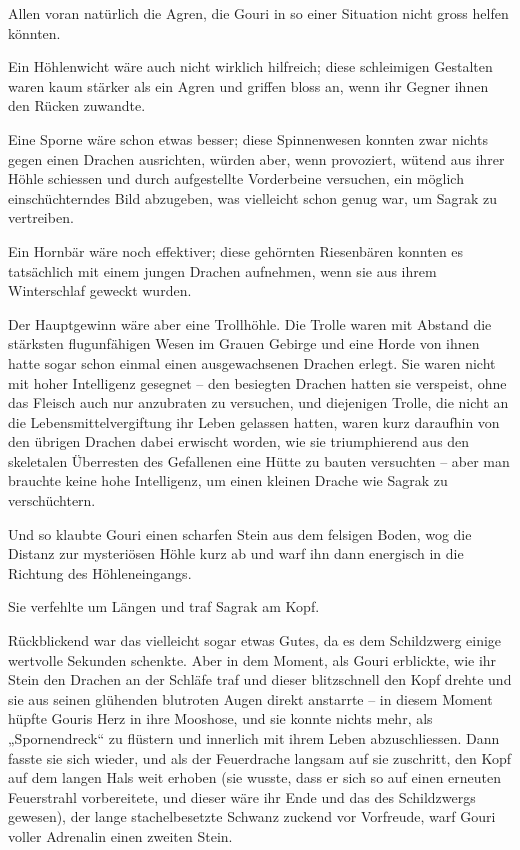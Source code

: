 Allen voran natürlich die Agren, die Gouri in so einer Situation nicht gross helfen könnten.

Ein Höhlenwicht wäre auch nicht wirklich hilfreich; diese schleimigen Gestalten waren kaum stärker als ein Agren und griffen bloss an, wenn ihr Gegner ihnen den Rücken zuwandte.

Eine Sporne wäre schon etwas besser; diese Spinnenwesen konnten zwar nichts gegen einen Drachen ausrichten, würden aber, wenn provoziert, wütend aus ihrer Höhle schiessen und durch aufgestellte Vorderbeine versuchen, ein möglich einschüchterndes Bild abzugeben, was vielleicht schon genug war, um Sagrak zu vertreiben.

Ein Hornbär wäre noch effektiver; diese gehörnten Riesenbären konnten es tatsächlich mit einem jungen Drachen aufnehmen, wenn sie aus ihrem Winterschlaf geweckt wurden.

Der Hauptgewinn wäre aber eine Trollhöhle. Die Trolle waren mit Abstand die stärksten flugunfähigen Wesen im Grauen Gebirge und eine Horde von ihnen hatte sogar schon einmal einen ausgewachsenen Drachen erlegt. Sie waren nicht mit hoher Intelligenz gesegnet – den besiegten Drachen hatten sie verspeist, ohne das Fleisch auch nur anzubraten zu versuchen, und diejenigen Trolle, die nicht an die Lebensmittelvergiftung ihr Leben gelassen hatten, waren kurz daraufhin von den übrigen Drachen dabei erwischt worden, wie sie triumphierend aus den skeletalen Überresten des Gefallenen eine Hütte zu bauten versuchten – aber man brauchte keine hohe Intelligenz, um einen kleinen Drache wie Sagrak zu verschüchtern.

Und so klaubte Gouri einen scharfen Stein aus dem felsigen Boden, wog die Distanz zur mysteriösen Höhle kurz ab und warf ihn dann energisch in die Richtung des Höhleneingangs.

Sie verfehlte um Längen und traf Sagrak am Kopf.

Rückblickend war das vielleicht sogar etwas Gutes, da es dem Schildzwerg einige wertvolle Sekunden schenkte. Aber in dem Moment, als Gouri erblickte, wie ihr Stein den Drachen an der Schläfe traf und dieser blitzschnell den Kopf drehte und sie aus seinen glühenden blutroten Augen direkt anstarrte – in diesem Moment hüpfte Gouris Herz in ihre Mooshose, und sie konnte nichts mehr, als „Spornendreck“ zu flüstern und innerlich mit ihrem Leben abzuschliessen. Dann fasste sie sich wieder, und als der Feuerdrache langsam auf sie zuschritt, den Kopf auf dem langen Hals weit erhoben (sie wusste, dass er sich so auf einen erneuten Feuerstrahl vorbereitete, und dieser wäre ihr Ende und das des Schildzwergs gewesen), der lange stachelbesetzte Schwanz zuckend vor Vorfreude, warf Gouri voller Adrenalin einen zweiten Stein.

